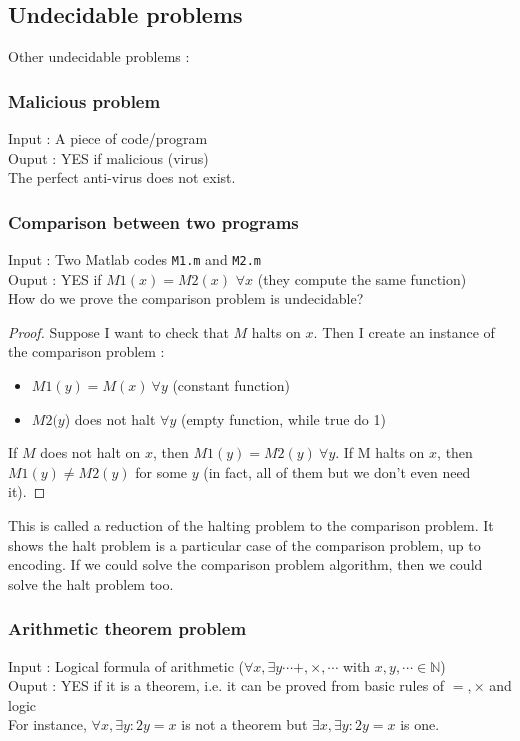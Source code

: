 \subsection{Undecidable problems}

Other undecidable problems :
\subsubsection{Malicious problem}
Input : A piece of code/program\\
Ouput : YES if malicious (virus)\\
The perfect anti-virus does not exist.

\subsubsection{Comparison between two programs}
Input : Two Matlab codes \texttt{M1.m} and \texttt{M2.m}\\
Ouput : YES if $M1(x) = M2(x)$ $\forall x$ (they compute the same function)\\
How do we prove the comparison problem is undecidable?
\begin{proof} Suppose I want to check that $M$ halts on $x$. Then I create an instance of the comparison problem : 
\begin{itemize}
\item $M1(y) = M(x) \ \forall y$ (constant function)
\item $M2(y$) does not halt $\forall y$ (empty function, while true do 1)
\end{itemize}
If $M$ does not halt on $x$, then $M1(y) = M2(y) \ \forall y$. If M halts on $x$, then  $M1(y) \neq M2(y)$ for some $y$ (in fact, all of them but we don't even need it).
\end{proof}
This is called a reduction of the halting problem to the comparison problem. It shows the halt problem is a particular case of the comparison problem, up to encoding. If we could solve the comparison problem algorithm, then we could solve the halt problem too.

\subsubsection{Arithmetic theorem problem}
Input : Logical formula of arithmetic ($\forall x, \exists y \cdots +, \times, \cdots$ with $x,y,\cdots \in \mathbb{N}$)\\
Ouput : YES if it is a theorem, i.e. it can be proved from basic rules of $=,\times$ and logic\\
For instance, $\forall x, \exists y : 2y = x$ is not a theorem but  $\exists x, \exists y : 2y = x$ is one.\\

